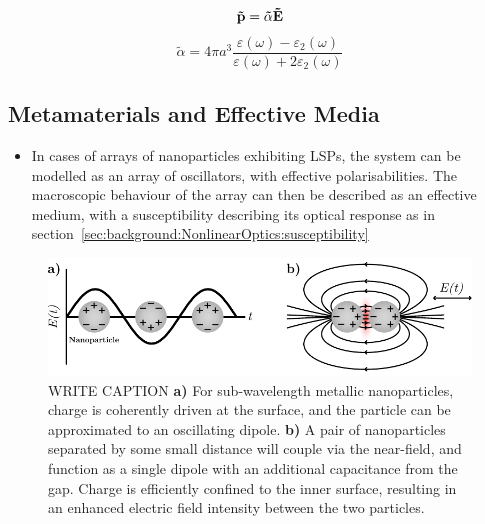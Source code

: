 \begin{equation}\label{eq:Plasmonics:LSPdipole}
    {\bf{\tilde p}} = {\bf{\tilde \alpha }}{\bf{\tilde E}}
\end{equation}
\begin{equation}\label{eq:Plasmonics:LSPalphaSphere}
    {\tilde \alpha } = 4\pi a^3 \frac{\varepsilon (\omega) - \varepsilon_2 (\omega)}{\varepsilon (\omega) + 2\varepsilon_2 (\omega)}
\end{equation}

\subsection{Metamaterials and Effective Media}
\begin{itemize}
    \item In cases of arrays of nanoparticles exhibiting LSPs, the system can be modelled as an array of oscillators, with effective polarisabilities. The macroscopic behaviour of the array can then be described as an effective medium, with a susceptibility describing its optical response as in section~\ref{sec:background:NonlinearOptics:susceptibility}
\end{itemize}

\begin{figure}[htb!]
    \centering
    \includegraphics[scale=1.0]{./figures/background/plasmonics/lsp.pdf}
    \caption{\label{fig:background:Plasmonics:LSP} WRITE CAPTION \textbf{a)} For sub-wavelength metallic nanoparticles, charge is coherently driven at the surface, and the particle can be approximated to an oscillating dipole. \textbf{b)} A pair of nanoparticles separated by some small distance will couple via the near-field, and function as a single dipole with an additional capacitance from the gap. Charge is efficiently confined to the inner surface, resulting in an enhanced electric field intensity between the two particles.}
\end{figure}



